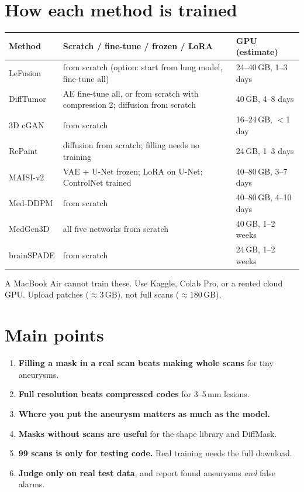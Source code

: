 \documentclass[11pt,a4paper,oneside]{report}
\begin{document}
\section*{How each method is trained}
\begin{center}
\small
\begin{tabularx}{\linewidth}{lXl}
\toprule
\textbf{Method} & \textbf{Scratch / fine-tune / frozen / LoRA} & \textbf{GPU (estimate)} \\
\midrule
LeFusion & from scratch (option: start from lung model, fine-tune all) & 24--40\,GB, 1--3 days \\
DiffTumor & AE fine-tune all, or from scratch with compression 2; diffusion from scratch & 40\,GB, 4--8 days \\
3D cGAN & from scratch & 16--24\,GB, $<$1 day \\
RePaint & diffusion from scratch; filling needs no training & 24\,GB, 1--3 days \\
MAISI-v2 & VAE + U-Net frozen; LoRA on U-Net; ControlNet trained & 40--80\,GB, 3--7 days \\
Med-DDPM & from scratch & 40--80\,GB, 4--10 days \\
MedGen3D & all five networks from scratch & 40\,GB, 1--2 weeks \\
brainSPADE & from scratch & 24\,GB, 1--2 weeks \\
\bottomrule
\end{tabularx}
\end{center}
A MacBook Air cannot train these. Use Kaggle, Colab Pro, or a rented cloud GPU. Upload patches ($\approx$3\,GB), not full scans ($\approx$180\,GB).

\section*{Main points}
\begin{enumerate}
  \item \textbf{Filling a mask in a real scan beats making whole scans} for tiny aneurysms.
  \item \textbf{Full resolution beats compressed codes} for 3--5\,mm lesions.
  \item \textbf{Where you put the aneurysm matters as much as the model.}
  \item \textbf{Masks without scans are useful} for the shape library and DiffMask.
  \item \textbf{99 scans is only for testing code.} Real training needs the full download.
  \item \textbf{Judge only on real test data}, and report found aneurysms \emph{and} false alarms.
\end{enumerate}
\end{document}

